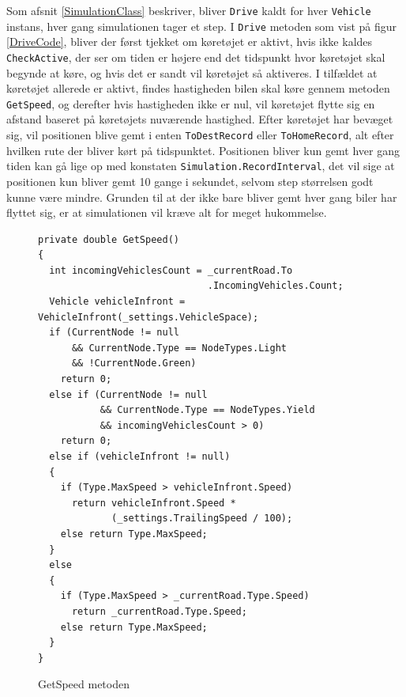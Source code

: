 Som afsnit \ref{SimulationClass} beskriver, bliver \texttt{Drive} kaldt for hver \texttt{Vehicle} instans, hver gang simulationen tager et step. I \texttt{Drive} metoden som vist på figur \ref{DriveCode}, bliver der først tjekket om køretøjet er aktivt, hvis ikke kaldes \texttt{CheckActive}, der ser om tiden er højere end det tidspunkt hvor køretøjet skal begynde at køre, og hvis det er sandt vil køretøjet så aktiveres. I tilfældet at køretøjet allerede er aktivt, findes hastigheden bilen skal køre gennem metoden \texttt{GetSpeed}, og derefter hvis hastigheden ikke er nul, vil køretøjet flytte sig en afstand baseret på køretøjets nuværende hastighed. Efter køretøjet har bevæget sig, vil positionen blive gemt i enten \texttt{ToDestRecord} eller \texttt{ToHomeRecord}, alt efter hvilken rute der bliver kørt på tidspunktet. Positionen bliver kun gemt hver gang tiden kan gå lige op med konstaten \texttt{Simulation.RecordInterval}, det vil sige at positionen kun bliver gemt 10 gange i sekundet, selvom step størrelsen godt kunne være mindre. Grunden til at der ikke bare bliver gemt hver gang biler har flyttet sig, er at simulationen vil kræve alt for meget hukommelse.

\begin{figure}[H]
\begin{lstlisting}
private double GetSpeed()
{
  int incomingVehiclesCount = _currentRoad.To
                              .IncomingVehicles.Count;
  Vehicle vehicleInfront = VehicleInfront(_settings.VehicleSpace);
  if (CurrentNode != null 
      && CurrentNode.Type == NodeTypes.Light 
      && !CurrentNode.Green)
    return 0;
  else if (CurrentNode != null 
           && CurrentNode.Type == NodeTypes.Yield
           && incomingVehiclesCount > 0)
    return 0;
  else if (vehicleInfront != null)
  {
    if (Type.MaxSpeed > vehicleInfront.Speed)
      return vehicleInfront.Speed * 
             (_settings.TrailingSpeed / 100);
    else return Type.MaxSpeed;
  }
  else
  {
    if (Type.MaxSpeed > _currentRoad.Type.Speed)
      return _currentRoad.Type.Speed;
    else return Type.MaxSpeed;
  }
}
\end{lstlisting}
\caption{GetSpeed metoden}\label{GetSpeedCode}
\end{figure}

